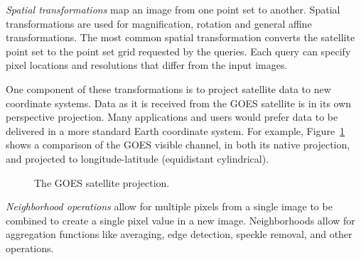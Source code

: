 \documentclass{ucdthesis}       %
\begin{document}
\emph{Spatial transformations} map an image from one point set to
another.  Spatial transformations are used for magnification, rotation
and general affine transformations.  The most common spatial
transformation converts the satellite point set to the point set grid
requested by the queries.  Each query can specify pixel locations and
resolutions that differ from the input images.

One component of these transformations is to project satellite data
to new coordinate systems.  Data as it is received from the \ac{GOES}
satellite is in its own perspective projection.  Many applications
and users would prefer data to be delivered in a more standard Earth
coordinate system.  For example, Figure~\ref{fig:ll} shows a
comparison of the \ac{GOES} visible channel, in both its native
projection, and projected to longitude-latitude (equidistant
cylindrical).

\begin{figure}[htb]
  \centering
\caption{The \ac{GOES} satellite projection. }
\label{fig:ll}
\end{figure}


\emph{Neighborhood operations} allow for multiple pixels from a single
image to be combined to create a single pixel value in a new image.
Neighborhoods allow for aggregation functions like averaging, edge
detection, speckle removal, and other operations.
\end{document}
